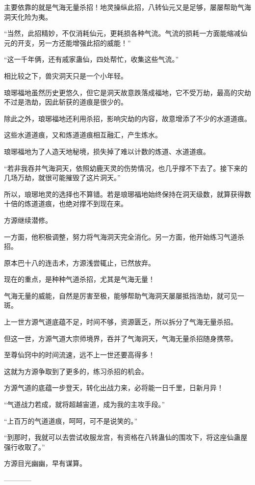 \begin{this_body}
主要依靠的就是气海无量杀招！地灵操纵此招，八转仙元又是足够，屡屡帮助气海洞天化险为夷。

“当然，此招精妙，不仅消耗仙元，更耗损各种气流。气流的损耗一方面能缩减仙元的开支，另一方还能增强此招的威能！”

“这一千年俩，还有戚家蛊仙，四处帮忙，收集这些气流。”

相比较之下，兽灾洞天只是一个小年轻。

琅琊福地虽然历史更悠久，但它是洞天故意跌落成福地，它不受万劫，最高的灾劫不过是浩劫，因此斩获的道痕是很少的。

除此之外，琅琊福地还利用杀招，影响灾劫的内容，故意增添了不少的水道道痕。

这些水道道痕，又和炼道道痕相互融汇，产生炼水。

琅琊福地为了人造天地秘境，损失掉了难以计数的炼道、水道道痕。

“若非我吞并气海洞天，依照幼鹿天灵的伤势情况，也几乎撑不下去了。接下来的几场万劫，就很可能摧毁了这片洞天。”

所以，琅琊地灵的选择也不算错。若是琅琊福地始终保持在洞天级数，就算获得数十倍的炼道道痕，也绝对撑不到现在来。

方源继续潜修。

一方面，他积极调整，努力将气海洞天完全消化。另一方面，他开始练习气道杀招。

原本巴十八的连击术，方源浅尝辄止，已然放弃。

现在的重点，是种种气道杀招，尤其是气海无量！

气海无量的威能，自然是厉害至极，能够帮助气海洞天屡屡抵挡浩劫，就可见一斑。

上一世方源气道底蕴不足，时间不够，资源匮乏，所以拆分了气海无量杀招。

但这一世，方源气道大宗师境界，吞并了气海洞天，气海无量杀招随身携带。

至尊仙窍中的时间流速，远不上一世还要高得多！

这就为方源争取到了更多的，练习杀招的机会。

方源气道的底蕴一步登天，转化出战力来，必将能一日千里，日新月异！

“气道战力若成，就将超越宙道，成为我的主攻手段。”

“上百万的气道道痕，呵呵，可不是说笑的。”

“到那时，我就可以去尝试收服龙宫，有资格在八转蛊仙的围攻下，将这座仙蛊屋强行收取了。”

方源目光幽幽，早有谋算。

------------

\end{this_body}

